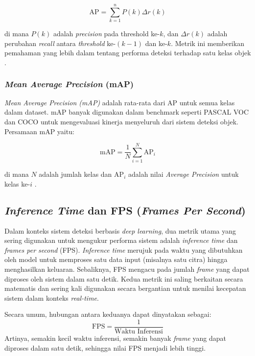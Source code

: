 \begin{equation}
\mbox{AP} = \sum_{k=1}^{n} P(k) \Delta r(k)
\label{eq:AP}
\end{equation}

di mana $P(k)$ adalah \emph{precision} pada threshold ke-$k$, dan $\Delta r(k)$ adalah perubahan \emph{recall} antara \emph{threshold} ke-$(k-1)$ dan ke-$k$. Metrik ini memberikan pemahaman yang lebih dalam tentang performa deteksi terhadap satu kelas objek \parencite*{oksuz2018localization}.

\subsubsection{\emph{Mean Average Precision} (mAP)}

\emph{Mean Average Precision (mAP)} adalah rata-rata dari AP untuk semua kelas dalam dataset. mAP banyak digunakan dalam benchmark seperti PASCAL VOC dan COCO untuk mengevaluasi kinerja menyeluruh dari sistem deteksi objek. Persamaan mAP yaitu:

\begin{equation}
\mbox{mAP} = \frac{1}{N} \sum_{i=1}^{N} \mbox{AP}_i
\label{eq:mAP}
\end{equation}

di mana $N$ adalah jumlah kelas dan $\mbox{AP}_i$ adalah nilai \emph{Average Precision} untuk kelas ke-$i$ \parencite*{padilla2020survey, oksuz2018localization}.

\subsection{\emph{Inference Time} dan FPS (\emph{Frames Per Second})}

Dalam konteks sistem deteksi berbasis \emph{deep learning}, dua metrik utama yang sering digunakan untuk mengukur performa sistem adalah \emph{inference time} dan \emph{frames per second} (FPS). \emph{Inference time} merujuk pada waktu yang dibutuhkan oleh model untuk memproses satu data input (misalnya satu citra) hingga menghasilkan keluaran. Sebaliknya, FPS mengacu pada jumlah \emph{frame} yang dapat diproses oleh sistem dalam satu detik. Kedua metrik ini saling berkaitan secara matematis dan sering kali digunakan secara bergantian untuk menilai kecepatan sistem dalam konteks \emph{real-time}.

Secara umum, hubungan antara keduanya dapat dinyatakan sebagai:
\begin{equation}
  \mbox{FPS} = \frac{1}{\mbox{Waktu Inferensi}}
  \label{eq:fps_inference_time}
\end{equation}
Artinya, semakin kecil waktu inferensi, semakin banyak \emph{frame} yang dapat diproses dalam satu detik, sehingga nilai FPS menjadi lebih tinggi.

